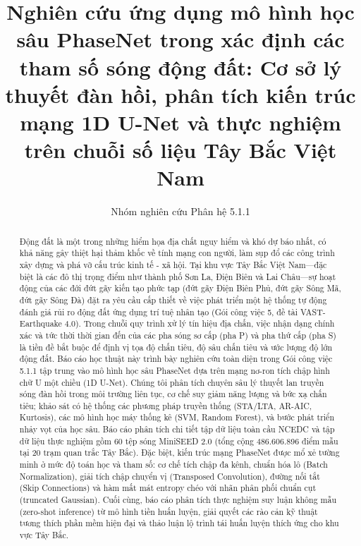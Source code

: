 \documentclass[preprint,1p]{elsarticle}
\begin{document}
\begin{frontmatter}

\title{Nghiên cứu ứng dụng mô hình học sâu PhaseNet trong xác định các tham số sóng động đất: Cơ sở lý thuyết đàn hồi, phân tích kiến trúc mạng 1D U-Net và thực nghiệm trên chuỗi số liệu Tây Bắc Việt Nam}

\author[vast]{Nhóm nghiên cứu Phân hệ 5.1.1}


\begin{abstract}
Động đất là một trong những hiểm họa địa chất nguy hiểm và khó dự báo nhất, có khả năng gây thiệt hại thảm khốc về tính mạng con người, làm sụp đổ các công trình xây dựng và phá vỡ cấu trúc kinh tế - xã hội. Tại khu vực Tây Bắc Việt Nam---đặc biệt là các đô thị trọng điểm như thành phố Sơn La, Điện Biên và Lai Châu---sự hoạt động của các đới đứt gãy kiến tạo phức tạp (đứt gãy Điện Biên Phủ, đứt gãy Sông Mã, đứt gãy Sông Đà) đặt ra yêu cầu cấp thiết về việc phát triển một hệ thống tự động đánh giá rủi ro động đất ứng dụng trí tuệ nhân tạo (Gói công việc 5, đề tài VAST-Earthquake 4.0). Trong chuỗi quy trình xử lý tín hiệu địa chấn, việc nhận dạng chính xác và tức thời thời gian đến của các pha sóng sơ cấp (pha P) và pha thứ cấp (pha S) là tiền đề bắt buộc để định vị tọa độ chấn tiêu, độ sâu chấn tiêu và ước lượng độ lớn động đất. Báo cáo học thuật này trình bày nghiên cứu toàn diện trong Gói công việc 5.1.1 tập trung vào mô hình học sâu PhaseNet dựa trên mạng nơ-ron tích chập hình chữ U một chiều (1D U-Net). Chúng tôi phân tích chuyên sâu lý thuyết lan truyền sóng đàn hồi trong môi trường liên tục, cơ chế suy giảm năng lượng và bức xạ chấn tiêu; khảo sát có hệ thống các phương pháp truyền thống (STA/LTA, AR-AIC, Kurtosis), các mô hình học máy thống kê (SVM, Random Forest), và bước phát triển nhảy vọt của học sâu. Báo cáo phân tích chi tiết tập dữ liệu toàn cầu NCEDC và tập dữ liệu thực nghiệm gồm 60 tệp sóng MiniSEED 2.0 (tổng cộng 486.606.896 điểm mẫu tại 20 trạm quan trắc Tây Bắc). Đặc biệt, kiến trúc mạng PhaseNet được mổ xẻ tường minh ở mức độ toán học và tham số: cơ chế tích chập đa kênh, chuẩn hóa lô (Batch Normalization), giải tích chập chuyển vị (Transposed Convolution), đường nối tắt (Skip Connections) và hàm mất mát entropy chéo với nhãn phân phối chuẩn cụt (truncated Gaussian). Cuối cùng, báo cáo phân tích thực nghiệm suy luận không mẫu (zero-shot inference) từ mô hình tiền huấn luyện, giải quyết các rào cản kỹ thuật tương thích phần mềm hiện đại và thảo luận lộ trình tái huấn luyện thích ứng cho khu vực Tây Bắc.
\end{abstract}


\end{frontmatter}
\end{document}
